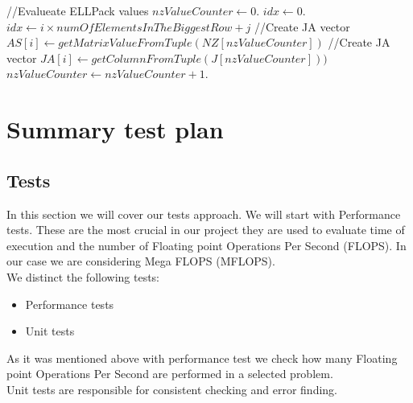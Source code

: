 \documentclass{scrreprt}
\begin{document}
\begin{algorithm}
\begin{algorithmic}[1]

\State //Evalueate ELLPack values
\State $nzValueCounter  \gets 0$.
\State $idx  \gets 0$.
        \State $idx \gets i \times numOfElementsInTheBiggestRow + j$
        \State //Create JA vector
          \State $AS[i] \gets getMatrixValueFromTuple(NZ[nzValueCounter])$
        \State //Create JA vector
         \State $JA[i] \gets getColumnFromTuple(J[nzValueCounter]))$
         \State $nzValueCounter \gets nzValueCounter+1$.
         \State

       \EndFor
      \EndFor

     \EndProcedure
\end{algorithmic}
\end{algorithm}
\FloatBarrier



\chapter{Summary test plan}

\section{Tests}

In this section we will cover our tests approach. We will start with Performance tests. These are the most crucial in our project they are used to evaluate time of execution and the number of Floating point Operations Per Second (FLOPS). In our case we are considering Mega FLOPS (MFLOPS).
\\
We distinct the following tests:
\\

\begin{itemize}
	\item Performance tests
	\item Unit tests
	
\end{itemize}  

As it was mentioned above with performance test we check how many Floating point Operations Per Second are performed in a selected problem.
\\
Unit tests are responsible for consistent checking and error finding.
\end{document}
